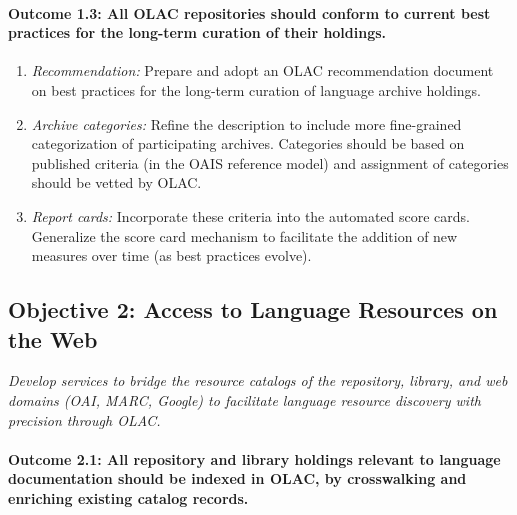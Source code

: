 \def\task{1.3}
\paragraph{Outcome {\task}: All OLAC repositories should conform to current best practices
      for the long-term curation of their holdings.}

\begin{enumerate}[label=\emph{\task\alph*}]\setlength{\itemsep}{0pt}
\item \emph{Recommendation:}
  Prepare and adopt an OLAC recommendation document on 
  best practices for the long-term curation of language archive holdings.
\item \emph{Archive categories:}
  Refine the {\tt <olac-archive>} description to include
  more fine-grained categorization of participating archives.
  Categories should be based on published criteria (in the OAIS reference model)
  and assignment of categories should be vetted by OLAC.
\item \emph{Report cards:}
  Incorporate these criteria into the automated score cards.
  Generalize the score card mechanism to facilitate the addition
  of new measures over time (as best practices evolve).
\end{enumerate}

\subsection*{Objective 2: Access to Language Resources on the Web}

\emph{Develop services to bridge the resource catalogs of the
  repository, library, and web domains (OAI, MARC, Google)
  to facilitate language resource discovery with precision through OLAC.}

\def\task{2.1}
\paragraph{Outcome {\task}:  All repository and library holdings relevant to language
   documentation should be indexed in OLAC, by
   crosswalking and enriching existing catalog records.}

